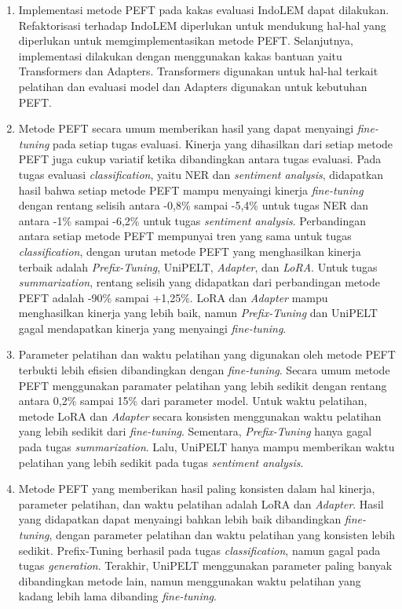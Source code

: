 \begin{enumerate}
    \item{
        Implementasi metode PEFT pada kakas evaluasi IndoLEM dapat dilakukan. Refaktorisasi terhadap IndoLEM diperlukan untuk mendukung hal-hal yang diperlukan untuk memgimplementasikan metode PEFT. Selanjutnya, implementasi dilakukan dengan menggunakan kakas bantuan yaitu Transformers dan Adapters. Transformers digunakan untuk hal-hal terkait pelatihan dan evaluasi model dan Adapters digunakan untuk kebutuhan PEFT.
    }
    \item {
            Metode PEFT secara umum memberikan hasil yang dapat menyaingi \textit{fine-tuning} pada setiap tugas evaluasi. Kinerja yang dihasilkan dari setiap metode PEFT juga cukup variatif ketika dibandingkan antara tugas evaluasi. Pada tugas evaluasi \textit{classification}, yaitu NER dan \textit{sentiment analysis}, didapatkan hasil bahwa setiap metode PEFT mampu menyaingi kinerja \textit{fine-tuning} dengan rentang selisih antara -0,8\% sampai -5,4\% untuk tugas NER dan antara -1\% sampai -6,2\% untuk tugas \textit{sentiment analysis}. Perbandingan antara setiap metode PEFT mempunyai tren yang sama untuk tugas \textit{classification}, dengan urutan metode PEFT yang menghasilkan kinerja terbaik adalah \textit{Prefix-Tuning}, UniPELT, \textit{Adapter}, dan \textit{LoRA}. Untuk tugas \textit{summarization}, rentang selisih yang didapatkan dari perbandingan metode PEFT adalah -90\% sampai +1,25\%. LoRA dan \textit{Adapter} mampu menghasilkan kinerja yang lebih baik, namun \textit{Prefix-Tuning} dan UniPELT gagal mendapatkan kinerja yang menyaingi \textit{fine-tuning}.
    }
    \item {
            Parameter pelatihan dan waktu pelatihan yang digunakan oleh metode PEFT terbukti lebih efisien dibandingkan dengan \textit{fine-tuning}. Secara umum metode PEFT menggunakan paramater pelatihan yang lebih sedikit dengan rentang antara 0,2\% sampai 15\% dari parameter model. Untuk waktu pelatihan, metode LoRA dan \textit{Adapter} secara konsisten menggunakan waktu pelatihan yang lebih sedikit dari \textit{fine-tuning}. Sementara, \textit{Prefix-Tuning} hanya gagal pada tugas \textit{summarization}. Lalu, UniPELT hanya mampu memberikan waktu pelatihan yang lebih sedikit pada tugas \textit{sentiment analysis}.
    }
    \item {
            Metode PEFT yang memberikan hasil paling konsisten dalam hal kinerja, parameter pelatihan, dan waktu pelatihan adalah LoRA dan \textit{Adapter}. Hasil yang didapatkan dapat menyaingi bahkan lebih baik dibandingkan \textit{fine-tuning}, dengan parameter pelatihan dan waktu pelatihan yang konsisten lebih sedikit. Prefix-Tuning berhasil pada tugas \textit{classification}, namun gagal pada tugas \textit{generation}. Terakhir, UniPELT menggunakan parameter paling banyak dibandingkan metode lain, namun menggunakan waktu pelatihan yang kadang lebih lama dibanding \textit{fine-tuning}.
    }
\end{enumerate}

